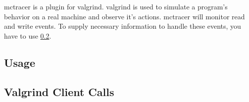 mctracer is a plugin for valgrind. valgrind is used to simulate a program's behavior on a real machine and observe it's actions. mctracer will monitor read and write events. To supply necessary information to handle these events, you have to use \ref{vgclientcalls}.
\subsection{Usage} 
\subsection{Valgrind Client Calls} \label{vgclientcalls} 
